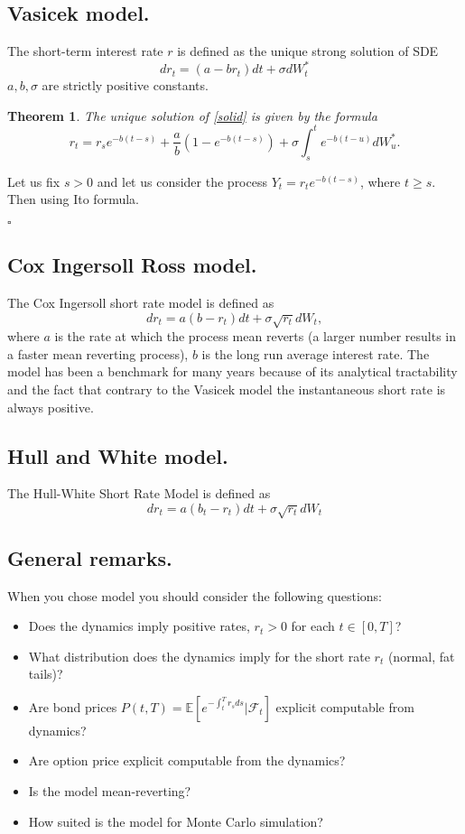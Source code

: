 \documentclass{book}
\newtheorem{theorem}{Theorem}[section]
\newenvironment{proof}
{{\bf Proof. }}{\begin{flushright}$\square$\end{flushright}}
\begin{document}
\subsection{Vasicek model.}
The short-term interest rate $r$ is defined as the unique strong solution of SDE
\begin{equation}
\label{solid}
dr_{t}=(a-br_{t})dt+\sigma dW_{t}^{\ast}
\end{equation}
$a,b,\sigma$ are strictly positive constants.
\begin{theorem}
The unique solution of \eqref{solid} is given by the formula
$$
r_{t}=r_{s}e^{-b(t-s)}+\frac{a}{b}\left(1-e^{-b(t-s)}\right)+\sigma \int_{s}^{t}e^{-b(t-u)}dW_{u}^{\ast}.
$$
\end{theorem}
\begin{proof}
Let us fix $s>0$ and let us consider the process $Y_{t}=r_{t}e^{-b(t-s)}$, where $t\geq s.$ Then using Ito formula.
\end{proof}
\subsection{Cox Ingersoll Ross model.}
The Cox Ingersoll short rate model is defined as
$$
dr_{t}=a(b-r_{t})dt+\sigma \sqrt{r_{t}} dW_{t},
$$
where $a$ is the rate at which the process mean reverts (a larger number results in a faster mean reverting process), $b$ is the long run average interest rate.
The model has been a benchmark for many years because of its analytical tractability and the fact that contrary to the Vasicek model the instantaneous short rate is always positive.
\subsection{Hull and White model.}
The Hull-White Short Rate Model is defined as
$$
dr_{t}=a(b_{t}-r_{t})dt+\sigma \sqrt{r_{t}} dW_{t}
$$
\subsection{General remarks.}
When you chose model you should consider the following questions:
\begin{itemize}
\item Does the dynamics imply positive rates, $r_{t}>0$ for each $t\in[0,T]$?
\item What distribution does the dynamics imply for the short rate $r_{t}$ (normal, fat tails)?
\item Are bond prices $P(t,T)=\mathbb{E}\left[e^{-\int_t^T r_{s}ds}\left|\mathcal{F}_{t}\right.\right]$ explicit computable from dynamics?
\item Are option price explicit computable from the dynamics?
\item Is the model mean-reverting?
\item How suited is the model for Monte Carlo simulation?
\end{itemize}
\end{document}
